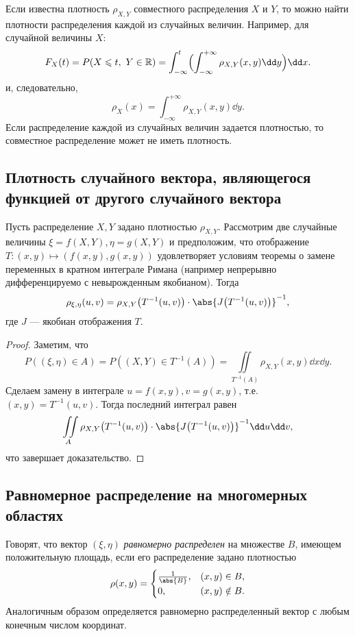Если известна плотность $\rho_{X, Y}$ совместного распределения $X$ и $Y$, то можно найти плотности распределения каждой из случайных величин.
Например, для случайной величины $X$:
\[
    F_X(t) = P(X \leqslant t,~Y \in \mathbb{R}) = \int_{-\infty}^t \Bigl( \int_{-\infty}^{+\infty} \rho_{X, Y}(x, y) \dd y \Bigr) \dd x.
\]
и, следовательно,
\[
    \rho_{X}(x) = \int_{-\infty}^{+\infty} \rho_{X, Y}(x, y) \dd y.
\]
Если распределение каждой из случайных величин задается плотностью, то совместное распределение
может не иметь плотность.

\sectionbreak
\subsection{Плотность случайного вектора, являющегося функцией от другого случайного вектора}

\begin{theorem}
    Пусть распределение $X, Y$ задано плотностью $\rho_{X, Y}$.
    Рассмотрим две случайные величины $\xi = f(X, Y), \eta = g(X, Y)$ и предположим, что отображение $T \colon (x,y) \mapsto (f(x,y), g(x,y))$ удовлетворяет условиям теоремы о замене переменных в кратном интеграле Римана (например непрерывно дифференцируемо с невырожденным якобианом).
    Тогда
    \[
        \rho_{\xi, \eta}(u, v) = \rho_{X, Y} \bigl( T^{-1}(u, v) \bigr) \cdot \abs{J \bigl( T^{-1}(u, v) \bigr)}^{-1},
    \]
    где $J$ --- якобиан отображения $T$.
\end{theorem}

\begin{proof}
    Заметим, что
    \[
        P((\xi, \eta) \in A) = P((X, Y) \in T^{-1}(A)) = \iint\limits_{T^{-1}(A)} \rho_{X, Y}(x, y) \dd x \dd y.
    \]
    Сделаем замену в интеграле $u = f(x, y), v = g(x, y)$, т.е. $(x, y) = T^{-1}(u, v)$.
    Тогда последний интеграл равен
    \[
        \iint\limits_{A} \rho_{X, Y}\bigl(T^{-1}(u, v)\bigr) \cdot \abs{J \bigl( T^{-1}(u, v) \bigr)}^{-1} \dd u \dd v,
    \]
    что завершает доказательство.
\end{proof}

\sectionbreak
\subsection{Равномерное распределение на многомерных областях}

Говорят, что вектор $(\xi, \eta)$ {\it равномерно распределен} на множестве $B$, имеющем положительную площадь, если его распределение задано плотностью
\[
    \rho(x, y) = \begin{cases}
        \frac{1}{\abs{B}}, & (x, y) \in B, \\
        0, & (x, y) \notin B.
    \end{cases}
\]
Аналогичным образом определяется равномерно распределенный вектор с любым конечным числом координат.
